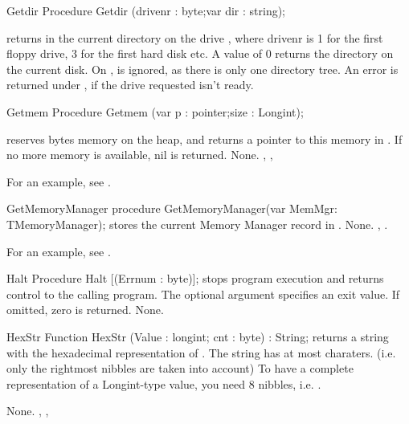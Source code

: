\documentclass{report}
\begin{document}

\begin{procedure}{Getdir}
\Declaration
Procedure Getdir (drivenr : byte;var dir : string);

\Description
{} returns in  the current directory on the drive
, where {drivenr} is 1 for the first floppy drive, 3 for the
first hard disk etc. A value of 0 returns the directory on the current disk.
On \linux,  is ignored, as there is only one directory tree.
\Errors
An error is returned under \dos, if the drive requested isn't ready.
\SeeAlso
{}
\end{procedure}


\begin{procedure}{Getmem}
\Declaration
Procedure Getmem (var p : pointer;size : Longint);

\Description
{} reserves  bytes memory on the heap, and returns a
pointer to this memory in . If no more memory is available, nil is
returned.
\Errors
None.
\SeeAlso
{}, , 
\end{procedure}
For an example, see .

\begin{procedure}{GetMemoryManager}
\Declaration
procedure GetMemoryManager(var MemMgr: TMemoryManager);
\Description
{} stores the current Memory Manager record in
.
\Errors
None.
\SeeAlso 
{}, .
\end{procedure}

For an example, see \progref.

\begin{procedure}{Halt}
\Declaration
Procedure Halt [(Errnum : byte)];
\Description
{} stops program execution and returns control to the calling
program. The optional argument  specifies an exit value. If
omitted, zero is returned.
\Errors
None.
\SeeAlso
{}
\end{procedure}


\begin{function}{HexStr}
\Declaration
Function HexStr (Value : longint; cnt : byte) : String;
\Description
{} returns a string with the hexadecimal representation
of . The string has at most  charaters.
 (i.e. only the  rightmost nibbles are taken into account)
To have a complete representation of a Longint-type value, you need 8
nibbles, i.e. .

\Errors
None.
\SeeAlso
{}, , 
\end{function}
\end{document}
